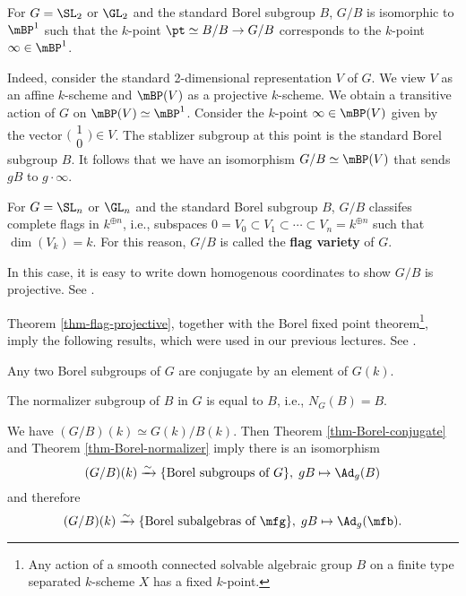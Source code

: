 	

	\begin{exam}
		\label{exam-SL2-flag}
		For $G=\SL_2$ or $\GL_2$ and the standard Borel subgroup $B$, $G/B$ is isomorphic to $\mBP^1$ such that the $k$-point $\pt\simeq B/B \to G/B$ corresponds to the $k$-point $\infty\in \mBP^1$.

		Indeed, consider the standard 2-dimensional representation $V$ of $G$. We view $V$ as an affine $k$-scheme and $\mBP(V)$ as a projective $k$-scheme. We obtain a transitive action of $G$ on $\mBP(V)\simeq \mBP^1$. Consider the $k$-point $\infty\in \mBP(V)$ given by the vector $\big(\begin{smallmatrix} 1\\ 0 \end{smallmatrix}\big)\in V$. The stablizer subgroup at this point is the standard Borel subgroup $B$. It follows that we have an isomorphism $G/B \simeq \mBP(V)$ that sends $gB$ to $g\cdot \infty$.
	\end{exam}

	\begin{exam}
		For $G=\SL_n$ or $\GL_n$ and the standard Borel subgroup $B$, $G/B$ classifes complete flags in $k^{\oplus n}$, i.e., subspaces $0=V_0 \subset V_1\subset \cdots \subset V_n = k^{\oplus n}$ such that $\dim(V_k)=k$. For this reason, $G/B$ is called the \textbf{flag variety} of $G$.

		In this case, it is easy to write down homogenous coordinates to show $G/B$ is projective. See \cite[Section 7.g]{M}.
	\end{exam}


	Theorem \ref{thm-flag-projective}, together with the Borel fixed point theorem\footnote{Any action of a smooth connected solvable algebraic group $B$ on a finite type separated $k$-scheme $X$ has a fixed $k$-point.}, imply the following results, which were used in our previous lectures. See \cite[Section 17]{M}.

	\begin{thm}
		\label{thm-Borel-conjugate}
		Any two Borel subgroups of $G$ are conjugate by an element of $G(k)$.
	\end{thm}

	\begin{thm}
		\label{thm-Borel-normalizer}
		The normalizer subgroup of $B$ in $G$ is equal to $B$, i.e., $N_G(B) = B$.
	\end{thm}



	\begin{constr}
		We have $(G/B)(k) \simeq G(k)/B(k)$. Then Theorem \ref{thm-Borel-conjugate} and Theorem \ref{thm-Borel-normalizer} imply there is an isomorphism
		\[
			(G/B)(k) \xrightarrow{\sim} \{\textrm{Borel subgroups of }G\},\; gB \mapsto \Ad_g(B)
		\]
		and therefore
		\[
			(G/B)(k) \xrightarrow{\sim} \{\textrm{Borel subalgebras of }\mfg\},\; gB \mapsto \Ad_g(\mfb).
		\]
	\end{constr}

